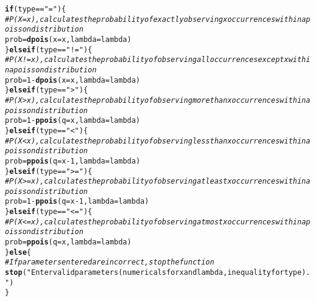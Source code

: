 \documentclass{article}\usepackage[]{graphicx}\usepackage[]{xcolor}
\makeatletter
\newcommand{\hlnum}[1]{\textcolor[rgb]{0.686,0.059,0.569}{#1}}%
\newcommand{\hlsng}[1]{\textcolor[rgb]{0.192,0.494,0.8}{#1}}%
\newcommand{\hlcom}[1]{\textcolor[rgb]{0.678,0.584,0.686}{\textit{#1}}}%
\newcommand{\hlopt}[1]{\textcolor[rgb]{0,0,0}{#1}}%
\newcommand{\hldef}[1]{\textcolor[rgb]{0.345,0.345,0.345}{#1}}%
\newcommand{\hlkwa}[1]{\textcolor[rgb]{0.161,0.373,0.58}{\textbf{#1}}}%
\newcommand{\hlkwb}[1]{\textcolor[rgb]{0.69,0.353,0.396}{#1}}%
\newcommand{\hlkwc}[1]{\textcolor[rgb]{0.333,0.667,0.333}{#1}}%
\newcommand{\hlkwd}[1]{\textcolor[rgb]{0.737,0.353,0.396}{\textbf{#1}}}%
\newenvironment{kframe}{%
 \def\at@end@of@kframe{}%
 \ifinner\ifhmode%
  \def\at@end@of@kframe{\end{minipage}}%
  \begin{minipage}{\columnwidth}%
 \fi\fi%
 \def\FrameCommand##1{\hskip\@totalleftmargin \hskip-\fboxsep
 \colorbox{shadecolor}{##1}\hskip-\fboxsep
     \hskip-\linewidth \hskip-\@totalleftmargin \hskip\columnwidth}%
 \MakeFramed {\advance\hsize-\width
   \@totalleftmargin\z@ \linewidth\hsize
   \@setminipage}}%
 {\par\unskip\endMakeFramed%
 \at@end@of@kframe}
\newenvironment{knitrout}{}{} %
\makeatother
\begin{document}
\begin{enumerate}
\begin{knitrout}
\begin{kframe}
\begin{alltt}
  \hlkwa{if}\hldef{(type} \hlopt{==} \hlsng{"="}\hldef{)\{}
    \hlcom{#P(X=x), calculates the probability of exactly observing x occurrences within a poisson distribution}
    \hldef{prob} \hlkwb{=} \hlkwd{dpois}\hldef{(}\hlkwc{x} \hldef{= x,} \hlkwc{lambda} \hldef{= lambda)}
  \hldef{\}} \hlkwa{else if}\hldef{(type} \hlopt{==} \hlsng{"!="}\hldef{)\{}
    \hlcom{#P(X!=x), calculates the probability of observing all occurrences except x within a poisson distribution}
    \hldef{prob} \hlkwb{=} \hlnum{1} \hlopt{-} \hlkwd{dpois}\hldef{(}\hlkwc{x} \hldef{= x,} \hlkwc{lambda} \hldef{= lambda)}
  \hldef{\}} \hlkwa{else if}\hldef{(type} \hlopt{==} \hlsng{">"}\hldef{) \{}
    \hlcom{#P(X>x), calculates the probability of observing more than x occurrences within a poisson distribution}
    \hldef{prob} \hlkwb{=} \hlnum{1} \hlopt{-} \hlkwd{ppois}\hldef{(}\hlkwc{q} \hldef{= x,} \hlkwc{lambda} \hldef{= lambda)}
  \hldef{\}} \hlkwa{else if}\hldef{(type} \hlopt{==} \hlsng{"<"}\hldef{) \{}
    \hlcom{#P(X<x), calculates the probability of observing less than x occurrences within a poisson distribution}
    \hldef{prob} \hlkwb{=} \hlkwd{ppois}\hldef{(}\hlkwc{q} \hldef{= x} \hlopt{-} \hlnum{1}\hldef{,} \hlkwc{lambda} \hldef{= lambda)}
  \hldef{\}} \hlkwa{else if}\hldef{(type} \hlopt{==} \hlsng{">="}\hldef{) \{}
    \hlcom{#P(X>=x), calculates the probability of observing at least x occurrences within a poisson distribution}
    \hldef{prob} \hlkwb{=} \hlnum{1} \hlopt{-} \hlkwd{ppois}\hldef{(}\hlkwc{q} \hldef{= x} \hlopt{-} \hlnum{1}\hldef{,} \hlkwc{lambda} \hldef{= lambda)}
  \hldef{\}} \hlkwa{else if}\hldef{(type} \hlopt{==} \hlsng{"<="}\hldef{) \{}
    \hlcom{#P(X<=x), calculates the probability of observing at most x occurrences within a poisson distribution}
    \hldef{prob} \hlkwb{=} \hlkwd{ppois}\hldef{(}\hlkwc{q} \hldef{= x,} \hlkwc{lambda} \hldef{= lambda)}
  \hldef{\}} \hlkwa{else} \hldef{\{}
    \hlcom{#If parameters entered are incorrect, stop the function}
    \hlkwd{stop}\hldef{(}\hlsng{"Enter valid parameters (numericals for x and lambda, inequality for type)."}\hldef{)}
  \hldef{\}}


\end{alltt}
\end{kframe}
\end{knitrout}
\end{enumerate}
\end{document}
